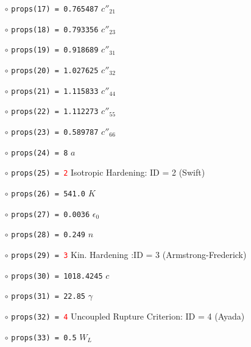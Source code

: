 \documentclass[11pt,a4paper,twoside,final,onecolumn,titlepage]{article}
\begin{document}
\begin{itemize}
		\item[$\circ$] \texttt{props(17) = 0.765487} \hspace{60pt} $c''_{21}$
		\item[$\circ$] \texttt{props(18) = 0.793356} \hspace{60pt} $c''_{23}$
		\item[$\circ$] \texttt{props(19) = 0.918689} \hspace{60pt} $c''_{31}$
		\item[$\circ$] \texttt{props(20) = 1.027625} \hspace{60pt} $c''_{32}$
		\item[$\circ$] \texttt{props(21) = 1.115833} \hspace{60pt} $c''_{44}$
		\item[$\circ$] \texttt{props(22) = 1.112273} \hspace{60pt} $c''_{55}$
		\item[$\circ$] \texttt{props(23) = 0.589787} \hspace{60pt} $c''_{66}$
		\item[$\circ$] \texttt{props(24) = 8} \hspace{100pt} $a$
		\item[$\circ$] \texttt{props(25) = \textcolor{red}{2}} \hspace{100pt} Isotropic Hardening: ID = 2 (Swift)
		\item[$\circ$] \texttt{props(26) = 541.0} \hspace{76pt} $K$
		\item[$\circ$] \texttt{props(27) = 0.0036} \hspace{72pt} $\epsilon_0$
		\item[$\circ$] \texttt{props(28) = 0.249} \hspace{78pt} $n$
		\item[$\circ$] \texttt{props(29) = \textcolor{red}{3}} \hspace{101pt} Kin. Hardening :ID = 3 (Armstrong-Frederick)
		\item[$\circ$] \texttt{props(30) = 1018.4245} \hspace{56pt} $c$
		\item[$\circ$] \texttt{props(31) = 22.85} \hspace{78pt} $\gamma$
		\item[$\circ$] \texttt{props(32) = \textcolor{red}{4}} \hspace{101pt} Uncoupled Rupture Criterion: ID = 4 (Ayada)
		\item[$\circ$] \texttt{props(33) = 0.5} \hspace{89pt} $W_{L}$
\end{itemize}
\end{document}
